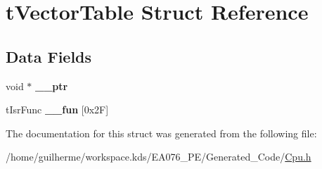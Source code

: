 \hypertarget{structt_vector_table}{}\section{t\+Vector\+Table Struct Reference}
\label{structt_vector_table}
\subsection*{Data Fields}
\begin{DoxyCompactItemize}
\item 
\mbox{\label{structt_vector_table_a324d365e9c8c6c033f4edbc906f94844}} 
void $\ast$ {\bfseries \+\_\+\+\_\+ptr}
\item 
\mbox{\label{structt_vector_table_aeef9a059db36607f5d6f00cfc5a50f4e}} 
t\+Isr\+Func {\bfseries \+\_\+\+\_\+fun} \mbox{[}0x2\+F\mbox{]}
\end{DoxyCompactItemize}


The documentation for this struct was generated from the following file\+:\begin{DoxyCompactItemize}
\item 
/home/guilherme/workspace.\+kds/\+E\+A076\+\_\+\+P\+E/\+Generated\+\_\+\+Code/\hyperlink{_cpu_8h}{Cpu.\+h}\end{DoxyCompactItemize}
